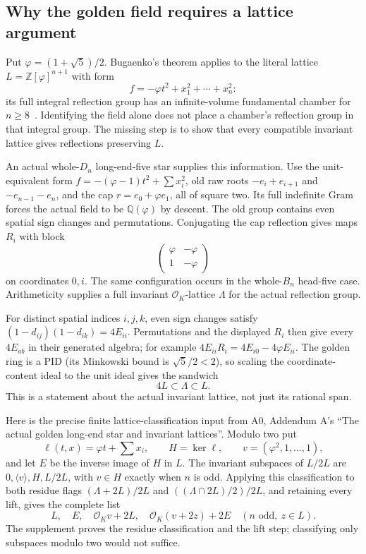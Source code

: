\documentclass[11pt]{article}
\theoremstyle{remark}\newtheorem{remark}[theorem]{Remark}
\numberwithin{equation}{section}
\newcommand{\Q}{\mathbb Q}
\newcommand{\Z}{\mathbb Z}
\begin{document}
\subsection{Why the golden field requires a lattice argument}
\label{arith:app:arithgoldenlongstar}
Put $\varphi=(1+\sqrt5)/2$. Bugaenko's theorem applies to the literal
lattice $L=\Z[\varphi]^{n+1}$ with form
\[
 f=-\varphi t^2+x_1^2+\cdots+x_n^2:
\]
its full integral reflection group has an infinite-volume fundamental
chamber for $n\ge8$~\cite{BugaenkoGolden1984}. Identifying the field
alone does not place a chamber's reflection group in that integral group.
The missing step is to show that every compatible invariant lattice gives
reflections preserving $L$.

An actual whole-$D_n$ long-end-five star supplies this information.
Use the unit-equivalent form $f=-(\varphi-1)t^2+\sum x_i^2$, old
raw roots $-e_i+e_{i+1}$ and $-e_{n-1}-e_n$, and the cap
$r=e_0+\varphi e_1$, all of square two. Its full indefinite Gram
forces the actual field to be $\Q(\varphi)$ by descent. The old group
contains even spatial sign changes and permutations. Conjugating the
cap reflection gives maps $R_i$ with block
\[
 \begin{pmatrix}\varphi&-\varphi\\1&-\varphi\end{pmatrix}
\]
on coordinates $0,i$. The same configuration occurs in the whole-$B_n$
head-five case. Arithmeticity supplies a full invariant
$\mathcal O_K$-lattice $\Lambda$ for the actual reflection group.

For distinct spatial indices $i,j,k$, even sign changes satisfy
$(1-d_{ij})(1-d_{ik})=4E_{ii}$. Permutations and the displayed
$R_i$ then give every $4E_{ab}$ in their generated algebra; for example
$4E_{ii}R_i=4E_{i0}-4\varphi E_{ii}$. The golden ring is a PID
(its Minkowski bound is $\sqrt5/2<2$), so scaling the coordinate-content
ideal to the unit ideal gives the sandwich
\[
 4L\subset\Lambda\subset L.
\]
This is a statement about the actual invariant lattice, not just its
rational span.

Here is the precise finite lattice-classification input from A0,
Addendum A's ``The actual golden long-end star and invariant lattices''.
Modulo two put
\[
 \ell(t,x)=\varphi t+\sum x_i,\qquad H=\ker\ell,
 \qquad v=(\varphi^2,1,\ldots,1),
\]
and let $E$ be the inverse image of $H$ in $L$. The invariant subspaces
of $L/2L$ are $0,\langle v\rangle,H,L/2L$, with $v\in H$ exactly
when $n$ is odd. Applying this classification to both residue flags
$(\Lambda+2L)/2L$ and $((\Lambda\cap2L)/2)/2L$, and retaining every
lift, gives the complete list
\[
 L,\quad E,\quad\mathcal O_Kv+2L,\quad
 \mathcal O_K(v+2z)+2E\quad(n\text{ odd},\ z\in L).
\]
The supplement proves the residue classification and the lift step;
classifying only subspaces modulo two would not suffice.
\end{document}

